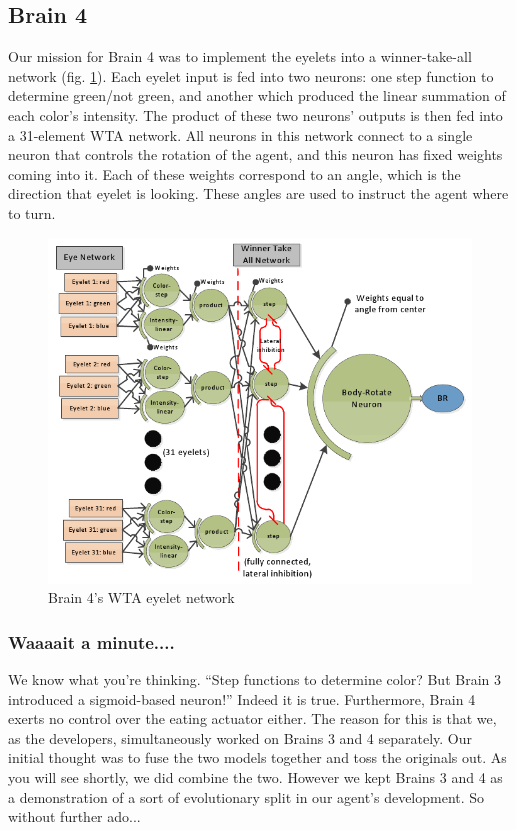 \subsection{Brain 4}

Our mission for Brain 4 was to implement the eyelets into a
winner-take-all network (fig. \ref{fig:brain4}). Each eyelet input is fed 
into two neurons: one step function to determine green/not green, and another 
which produced the linear summation of each color's intensity. The product of 
these two neurons' outputs is then fed into a 31-element WTA network. All 
neurons in this network connect to a single neuron that controls the rotation 
of the agent, and this neuron has fixed weights coming into it. Each of these 
weights correspond to an angle, which is the direction that eyelet is looking. 
These angles are used to instruct the agent where to turn.

\begin{figure}
\begin{center}
  \includegraphics[scale=.62]{img/brain4.png}
  \caption{Brain 4's WTA eyelet network}
  \label{fig:brain4}
\end{center}
\end{figure}

\subsubsection{Waaaait a minute....}
We know what you're thinking. ``Step functions to determine color? But Brain 
3 introduced a sigmoid-based neuron!'' Indeed it is true. Furthermore, Brain
4 exerts no control over the eating actuator either. The reason for this is
that we, as the developers, simultaneously worked on Brains 3 and 4 separately.
Our initial thought was to fuse the two models together and toss the originals 
out. As you will see shortly, we did combine the two. However we kept Brains 
3 and 4 as a demonstration of a sort of evolutionary split in our agent's 
development. So without further ado...

